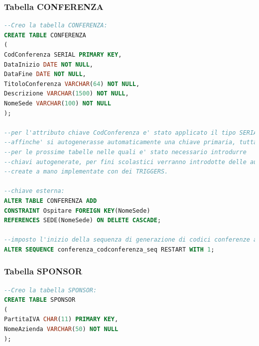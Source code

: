 \documentclass[a4page]{article}
\begin{document}
\subsubsection{Tabella CONFERENZA}
\begin{lstlisting}[language=SQL,
        deletekeywords={IDENTITY,INT},
        morekeywords={clustered},    
        framesep=10pt,
        framextopmargin=10pt]
--Creo la tabella CONFERENZA: 
CREATE TABLE CONFERENZA
(
CodConferenza SERIAL PRIMARY KEY,
DataInizio DATE NOT NULL,
DataFine DATE NOT NULL,
TitoloConferenza VARCHAR(64) NOT NULL,
Descrizione VARCHAR(1500) NOT NULL,
NomeSede VARCHAR(100) NOT NULL
);

--per l'attributo chiave CodConferenza e' stato applicato il tipo SERIAL
--affinche' si autogenerasse automaticamente una chiave primaria, tuttavia
--per le prossime tabelle nelle quali e' stato necessario introdurre
--chiavi autogenerate, per fini scolastici verranno introdotte delle automazioni
--create a mano implementate con dei TRIGGERS.

--chiave esterna:
ALTER TABLE CONFERENZA ADD
CONSTRAINT Ospitare FOREIGN KEY(NomeSede)
REFERENCES SEDE(NomeSede) ON DELETE CASCADE;

--imposto l'inizio della sequenza di generazione di codici conferenze a 1
ALTER SEQUENCE conferenza_codconferenza_seq RESTART WITH 1;        

\end{lstlisting}
\subsubsection{Tabella SPONSOR}
\begin{lstlisting}[language=SQL,
        deletekeywords={IDENTITY,INT},
        morekeywords={clustered},    
        framesep=10pt,
        framextopmargin=10pt]
--Creo la tabella SPONSOR: 
CREATE TABLE SPONSOR
(
PartitaIVA CHAR(11) PRIMARY KEY,
NomeAzienda VARCHAR(50) NOT NULL
);        

\end{lstlisting}
\end{document}
